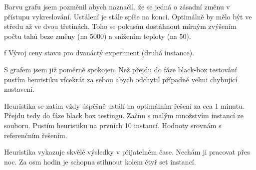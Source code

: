 Barvu grafu jsem pozměnil abych naznačil, že se jedná o zásadní změnu v přístupu vykreslování. Ustálení je stále spíše na konci. Optimálně by mělo být ve středu až ve dvou třetinách. Toho se pokusím dostáhnout mírným zvýšením počtu tahů beze změny (na 5000) a snížením teploty (na 50).

\centerline{ \picwidth=15cm  }
\caption/f Vývoj ceny stavu pro dvanáctý experiment (druhá instance).
\bigskip

S grafem jsem již poměrně spokojen. Než přejdu do fáze black-box testování pustím heuristiku vícekrát za sebou abych odchytil případně velmi chybující nastavení.

\bigskip
\centerline{}\bigskip

Heuristika se zatím vždy úspěšně ustálí na optimálním řešení za cca 1 minutu. Přejdu tedy do fáze black box testingu. Začnu s malým množstvím instancí ze souboru. Pustím heuristiku na prvních 10 instancí. Hodnoty srovnám s referenčním řešením.

\bigskip
\centerline{}\bigskip

Heuristika vykazuje skvělé výsledky v přijatelném čase. Nechám ji pracovat přes noc. Za osm hodin je schopna stihnout kolem čtyř set instancí.






